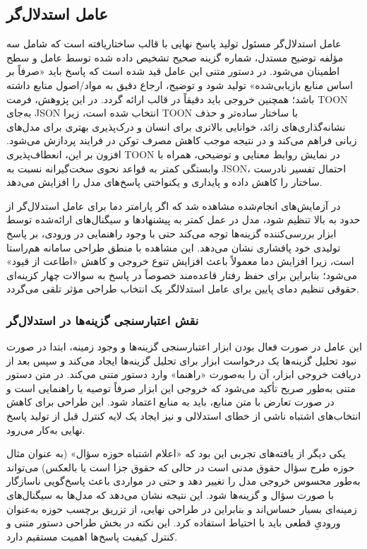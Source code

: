 \documentclass[12pt,a4paper]{report}
\begin{document}
	\subsection*{عامل استدلال‌گر}
	
	عامل استدلال‌گر مسئول تولید پاسخ نهایی با قالب ساختاریافته  است که شامل سه مؤلفه توضیح مستدل، شماره گزینه صحیح تشخیص داده شده توسط عامل و سطح اطمینان می‌شود. در دستور متنی این عامل قید شده است که پاسخ باید «صرفاً بر اساس منابع بازیابی‌شده» تولید شود و توضیح، ارجاع دقیق به مواد/اصول منابع داشته باشد؛ همچنین خروجی باید دقیقاً در قالب  ارائه گردد. در این پژوهش، فرمت TOON به‌جای JSON انتخاب شده است، زیرا TOON با ساختار ساده‌تر و حذف نشانه‌گذاری‌های زائد، خوانایی بالاتری برای انسان و درک‌پذیری بهتری برای مدل‌های زبانی فراهم می‌کند و در نتیجه موجب کاهش مصرف توکن در فرایند پردازش می‌شود. افزون بر این، انعطاف‌پذیری TOON در نمایش روابط معنایی و توضیحی، همراه با وابستگی کمتر به قواعد نحوی سخت‌گیرانه نسبت به JSON، احتمال تفسیر نادرست ساختار را کاهش داده و پایداری و یکنواختی پاسخ‌های مدل را افزایش می‌دهد.
	
	در آزمایش‌های انجام‌شده مشاهده شد که اگر پارامتر دما برای عامل استدلال‌گر از حدود  به بالا تنظیم شود، مدل در عمل کمتر به پیشنهادها و سیگنال‌های ارائه‌شده توسط ابزار بررسی‌کننده گزینه‌ها توجه می‌کند حتی با وجود راهنمایی در ورودی، بر پاسخ تولیدی خود پافشاری نشان می‌دهد. این مشاهده با منطق طراحی سامانه هم‌راستا است، زیرا افزایش دما معمولاً باعث افزایش تنوع خروجی و کاهش «اطاعت از قیود» می‌شود؛ بنابراین برای حفظ رفتار قاعده‌مند خصوصاً در پاسخ به سوالات چهار کزینه‌ای حقوقی تنظیم دمای پایین برای عامل استدلالگر یک انتخاب طراحی مؤثر تلقی می‌گردد.
	
	\subsubsection*{نقش اعتبارسنجی گزینه‌ها در استدلال‌گر}
	
	این عامل در صورت فعال بودن ابزار اعتبارسنجی گزینه‌ها و وجود زمینه، ابتدا در صورت نبود تحلیل گزینه‌ها  یک درخواست ابزار برای تحلیل گزینه‌ها ایجاد می‌کند و سپس بعد از دریافت خروجی ابزار، آن را به‌صورت «راهنما» وارد دستور متنی می‌کند. در متن دستور متنی به‌طور صریح تأکید می‌شود که خروجی این ابزار صرفاً توصیه یا راهنمایی است و در صورت تعارض با متن منابع، باید به منابع اعتماد شود. این طراحی برای کاهش انتخاب‌های اشتباه ناشی از خطای استدلالی و نیز ایجاد یک لایه کنترل قبل از تولید پاسخ نهایی به‌کار می‌رود.
	
	یکی دیگر از یافته‌های تجربی این بود که «اعلام اشتباه حوزه سؤال» (به عنوان مثال حوزه طرح سؤال حقوق مدنی است در حالی که حقوق جزا است یا بالعکس) می‌تواند به‌طور محسوس خروجی مدل را تغییر دهد و حتی در مواردی باعث پاسخ‌گویی ناسازگار با صورت سؤال و گزینه‌ها شود. این نتیجه نشان می‌دهد که مدل‌ها به سیگنال‌های زمینه‌ای بسیار حساس‌اند و بنابراین در طراحی نهایی، از تزریق برچسب حوزه به‌عنوان ورودیِ قطعی باید با احتیاط استفاده کرد. این نکته در بخش طراحی دستور متنی و کنترل کیفیت پاسخ‌ها اهمیت مستقیم دارد.
	
\end{document}
